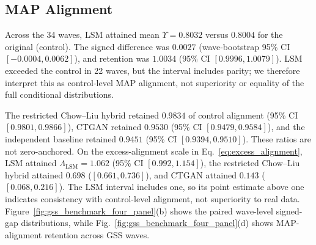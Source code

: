 \documentclass[runningheads]{llncs}
\begin{document}
\begin{table}[t]
\centering
\caption{Cross-wave benchmark summary over 34 GSS waves. The signed gap is
$\Upsilon_{\mathrm{generator}}-\Upsilon_{\mathrm{control}}$.
The excess-alignment fraction $\Lambda$ is defined in
Eq.~\eqref{eq:excess_alignment}. Confidence intervals are nonparametric 95\%
bootstrap intervals over waves; the null and control entries in the $\Lambda$
column are fixed anchors. Row novelty is one minus mean nearest-real
similarity.}
\label{tab:gss_benchmark}
\small
\setlength{\tabcolsep}{3.5pt}
\end{table}

\subsection{MAP Alignment}

Across the 34 waves, LSM attained mean $\Upsilon=0.8032$ versus $0.8004$
for the original (control). The signed difference was $0.0027$
(wave-bootstrap 95\% CI $[-0.0004,0.0062]$), and retention was $1.0034$ (95\%
CI $[0.9996,1.0079]$). LSM exceeded the control in 22 waves, but the interval
includes parity; we therefore interpret this as control-level MAP alignment,
not superiority or equality of the full conditional distributions.

The restricted Chow--Liu hybrid retained $0.9834$ of control alignment
(95\% CI $[0.9801,0.9866]$), CTGAN retained $0.9530$ (95\% CI
$[0.9479,0.9584]$), and the independent baseline retained $0.9451$ (95\% CI
$[0.9394,0.9510]$). These ratios are not zero-anchored. On the excess-alignment
scale in Eq.~\eqref{eq:excess_alignment}, LSM attained
$\Lambda_{\mathrm{LSM}}=1.062$ (95\% CI $[0.992,1.154]$), the restricted
Chow--Liu hybrid attained $0.698$ ($[0.661,0.736]$), and CTGAN attained $0.143$
($[0.068,0.216]$). The LSM interval includes one, so its point estimate above
one indicates consistency with control-level alignment, not superiority to real
data. Figure~\ref{fig:gss_benchmark_four_panel}(b) shows the paired wave-level
signed-gap distributions, while Fig.~\ref{fig:gss_benchmark_four_panel}(d)
shows MAP-alignment retention across GSS waves.
\end{document}
